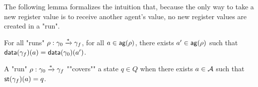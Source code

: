 The following lemma formalizes the intuition that, because the only way to take a new register value is to receive another agent's value, no new register values are created in a "run".
\begin{lemma}
\label{lem:run_no_new_register_values}
For all "runs" $\rho: \gamma_0 \xrightarrow{*} \gamma_f$, for all $a \in \mathsf{ag}(\rho)$, there exists $a' \in \mathsf{ag}(\rho)$ such that $\mathsf{data}(\gamma_f)(a) = \mathsf{data}(\gamma_0)(a')$.  
\end{lemma}


A "run" $\rho: \gamma_0 \xrightarrow{*} \gamma_f$ ""covers"" a state $q \in Q$ when there exists $a \in \mathcal{A}$ such that $\mathsf{st}(\gamma_f)(a) = q$. 



